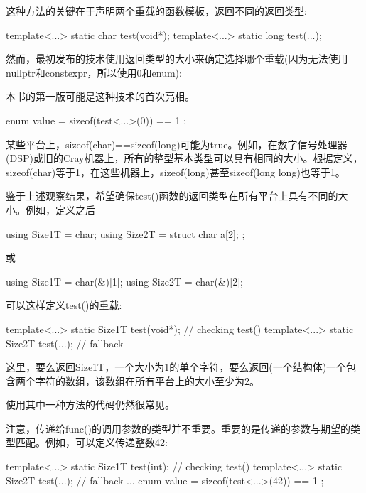 这种方法的关键在于声明两个重载的函数模板，返回不同的返回类型:

\begin{cpp}
template<...> static char test(void*);
template<...> static long test(...);
\end{cpp}

然而，最初发布的技术使用返回类型的大小来确定选择哪个重载(因为无法使用nullptr和constexpr，所以使用0和enum):

\begin{notice}
本书的第一版可能是这种技术的首次亮相。
\end{notice}

\begin{cpp}
enum { value = sizeof(test<...>(0)) == 1 };
\end{cpp}

某些平台上，sizeof(char)==sizeof(long)可能为true。例如，在数字信号处理器(DSP)或旧的Cray机器上，所有的整型基本类型可以具有相同的大小。根据定义，sizeof(char)等于1，在这些机器上，sizeof(long)甚至sizeof(long long)也等于1。

鉴于上述观察结果，希望确保test()函数的返回类型在所有平台上具有不同的大小。例如，定义之后

\begin{cpp}
using Size1T = char;
using Size2T = struct { char a[2]; };
\end{cpp}

或

\begin{cpp}
using Size1T = char(&)[1];
using Size2T = char(&)[2];
\end{cpp}

可以这样定义test()的重载:

\begin{cpp}
template<...> static Size1T test(void*); // checking test()
template<...> static Size2T test(...); // fallback
\end{cpp}

这里，要么返回Size1T，一个大小为1的单个字符，要么返回(一个结构体)一个包含两个字符的数组，该数组在所有平台上的大小至少为2。

使用其中一种方法的代码仍然很常见。

注意，传递给func()的调用参数的类型并不重要。重要的是传递的参数与期望的类型匹配。例如，可以定义传递整数42:

\begin{cpp}
template<...> static Size1T test(int); // checking test()
template<...> static Size2T test(...); // fallback
...
enum { value = sizeof(test<...>(42)) == 1 };
\end{cpp}

